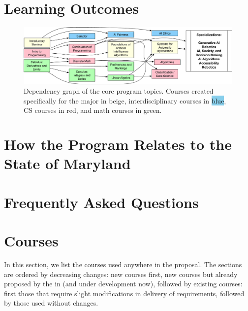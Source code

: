 \documentclass[
10pt, %
a4paper, %
oneside, %
headinclude,footinclude, %
BCOR5mm, %
]{scrartcl}
\begin{document}



\section{Learning Outcomes}



\begin{figure}

  \includegraphics[width=1.2\linewidth]{figures/dependency}
  \caption{Dependency graph of the core program topics.  Courses created specifically for the \ai{} major in \colorbox{yellow!30}{beige}, interdisciplinary courses in \colorbox{SkyBlue}{blue}, CS courses in \colorbox{red!30}{red}, and math courses in \colorbox{green!30}{green}.}
\end{figure}




\section{How the Program Relates to the State of Maryland}



\section{Frequently Asked Questions}



  \section{Courses}

In this section, we list the courses used anywhere in the proposal.  The sections are ordered by decreasing changes: new courses first, new courses but already proposed by the  in  (and under development now), followed by existing courses: first those that require slight modifications in delivery of requirements, followed by those used without changes.  
\end{document}
